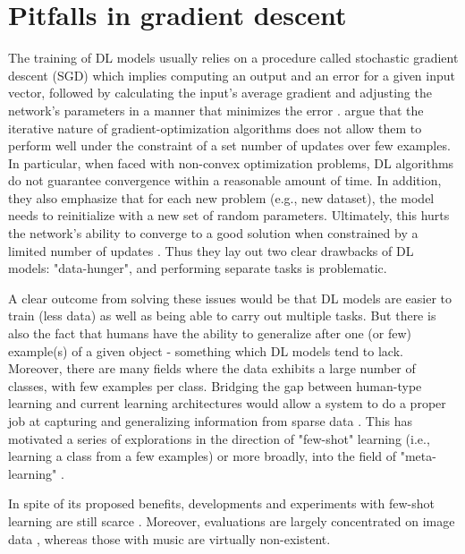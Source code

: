 \documentclass[a4paper]{book}
\begin{document}
\section{Pitfalls in gradient descent}\label{sec:hungry}

The training of DL models usually relies on a procedure called stochastic gradient descent (SGD) which implies computing an output and an error for a given input vector, followed by calculating the input's average gradient and adjusting the network's parameters in a manner that minimizes the error \parencite{lecun_deep_2015}. \textcite{ravi_optimization_2016} argue that the iterative nature of gradient-optimization algorithms does not allow them to perform well under the constraint of a set number of updates over few examples. In particular, when faced with non-convex optimization problems, DL algorithms do not guarantee convergence within a reasonable amount of time. In addition, they also emphasize that for each new problem (e.g., new dataset), the model needs to reinitialize with a new set of random parameters. Ultimately, this hurts the network's ability to converge to a good solution when constrained by a limited number of updates \parencite{ravi_optimization_2016}. Thus they lay out two clear drawbacks of DL models: "data-hunger", and performing separate tasks is problematic.

A clear outcome from solving these issues would be that DL models are easier to train (less data) as well as being able to carry out multiple tasks. But there is also the fact that humans have the ability to generalize after one (or few) example(s) of a given object \parencite{vinyals_matching_2016, chen_closer_2018, ravi_optimization_2016} - something which DL models tend to lack. Moreover, there are many fields where the data exhibits a large number of classes, with few examples per class. Bridging the gap between human-type learning and current learning architectures would allow a system to do a proper job at capturing and generalizing information from sparse data \parencite{ravi_optimization_2016, larochelle_few-shot_2017}. This has motivated a series of explorations in the direction of "few-shot" learning (i.e., learning a class from a few examples) or more broadly, into the field of "meta-learning" \parencite[learning to learn in hopes of generalizing to new tasks;][]{chen_closer_2018, vinyals_matching_2016, zhang_metagan_2018}.

In spite of its proposed benefits, developments and experiments with few-shot learning are still scarce \parencite{larochelle_few-shot_2017}. Moreover, evaluations are largely concentrated on image data \parencite[see][]{lake_omniglot_2019, clouatre_figr_2019, vinyals_matching_2016, chen_closer_2018, ravi_optimization_2016}, whereas those with music are virtually non-existent.
\end{document}
